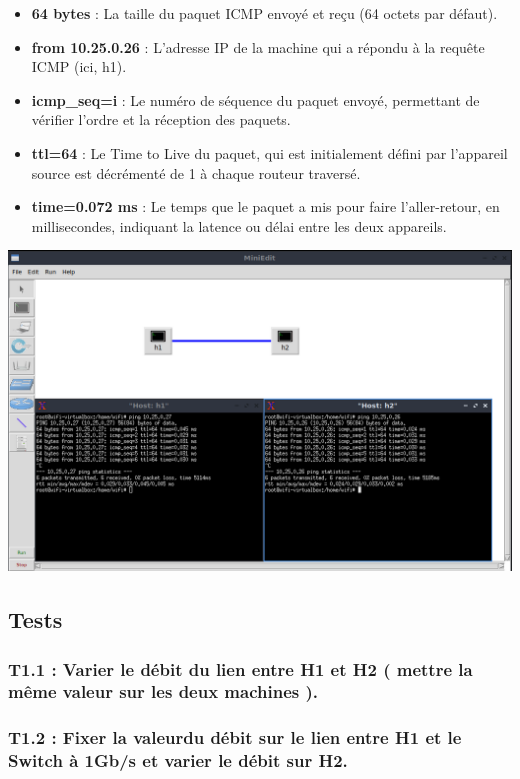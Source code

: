 \begin{itemize}
    \item \textbf{64 bytes} : La taille du paquet ICMP envoyé et reçu (64 octets par défaut).
    \item \textbf{from 10.25.0.26} : L'adresse IP de la machine qui a répondu à la requête ICMP (ici, h1).
    \item \textbf{icmp\_seq=i} : Le numéro de séquence du paquet envoyé, permettant de vérifier l'ordre et la réception des paquets.
    \item \textbf{ttl=64} : Le Time to Live du paquet, qui est initialement défini par l'appareil source est décrémenté de 1 à chaque routeur traversé.
    \item \textbf{time=0.072 ms} : Le temps que le paquet a mis pour faire l’aller-retour, en millisecondes, indiquant la latence ou délai entre les deux appareils.
\end{itemize}
\begin{center}
    \includegraphics[width=1\textwidth]{./images/TopologiePing.png}
\end{center}

\subsection{Tests}
\subsubsection{T1.1 : Varier le débit du lien entre H1 et H2 ( mettre la même valeur sur les deux machines ).}
 
\subsubsection{T1.2 : Fixer la valeurdu débit sur le lien entre H1 et le Switch à 1Gb/s et varier le débit sur H2.}
